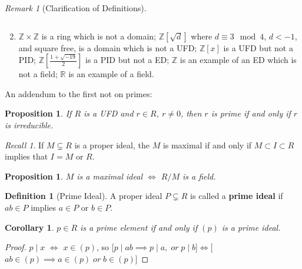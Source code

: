\documentclass[12pt]{article}
\newtheorem{cor}[thm]{Corollary}
\newtheorem{prop}[thm]{Proposition}
\theoremstyle{definition}
\newtheorem{defn}[thm]{Definition}
\theoremstyle{remark}
\newtheorem{rmk}[thm]{Remark}
\newtheorem*{rec}{Recall}
\numberwithin{equation}{section}
\newcommand\R{\mathbb R}    %
\newcommand\Z{\mathbb Z}    %
\newcommand\B[1]{\textbf{ #1}}
\begin{document}
\begin{rmk}[Clarification of Definitions]
\begin{enumerate}
\begin{equation}
                \end{equation}
                \item $\Z\times \Z$ is a ring which is not a domain; $\Z[\sqrt{d}]$ where $d \equiv 3 \mod 4$, $d < -1$, and square free, is a domain which is not a UFD; $\Z[x]$ is a UFD but not a PID; $\Z\left[\frac{1+\sqrt{-19}}{2}\right]$ is a PID but not a ED; $\Z$ is an example of an ED which is not a field; $\R$ is an example of a field.
        \end{enumerate}
        An addendum to the first not on primes:\begin{prop}
                                If $R$ is a UFD and $r \in R$, $r \neq 0$, then $r$ is prime if and only if $r$ is irreducible.
                \end{prop}
\end{rmk}

\vspace{15pt}

\begin{rec}
        If $M \subsetneq R$ is a proper ideal, the $M$ is maximal if and only if $M \subset I \subset R$ implies that $I = M$ or $R$.
\end{rec}

\vspace{15pt}

\begin{prop}
        $M$ is a maximal ideal $\iff$ $R/M$ is a field. 
\end{prop}

\vspace{15pt}

\begin{defn}[Prime Ideal]
        A proper ideal $P\subsetneq R$ is called a \B{prime ideal} if $ab \in P$ implies $a \in P$ or $b \in P$.
\end{defn}

\vspace{15pt}

\begin{cor}
        $p \in R$ is a prime element if and only if $(p)$ is a prime ideal.
\end{cor}
\begin{proof}
        $p\;\vert\;x$ $\iff $ $x \in (p)$, so [$p\;\vert\;ab\implies p\;\vert\;a,\;or\;p\;\vert\;b$]$\iff$[$ab\in(p)\implies a\in(p)\;or\;b\in(p)$]
\end{proof}

\vspace{15pt}
\end{document}
